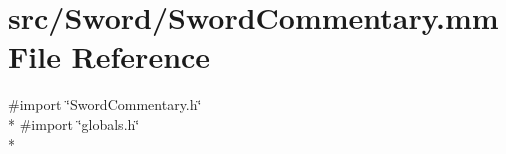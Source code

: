 \hypertarget{_sword_commentary_8mm}{\section{src/\-Sword/\-Sword\-Commentary.mm File Reference}
\label{_sword_commentary_8mm}
}
{\ttfamily \#import \char`\"{}Sword\-Commentary.\-h\char`\"{}}\\*
{\ttfamily \#import \char`\"{}globals.\-h\char`\"{}}\\*
